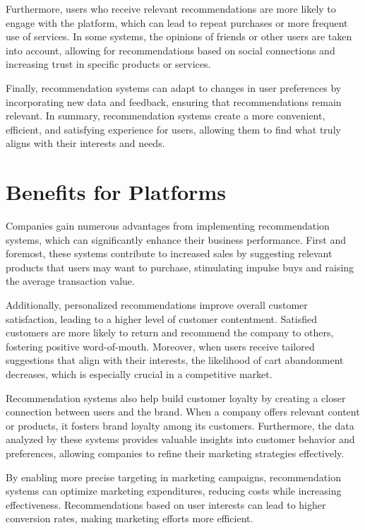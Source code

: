 \documentclass[10pt,twoside,slovak,a4paper]{article}
\begin{document}
Furthermore, users who receive relevant recommendations are more likely to engage with the platform, which can lead to repeat purchases or more frequent use of services. In some systems, the opinions of friends or other users are taken into account, allowing for recommendations based on social connections and increasing trust in specific products or services.

Finally, recommendation systems can adapt to changes in user preferences by incorporating new data and feedback, ensuring that recommendations remain relevant. In summary, recommendation systems create a more convenient, efficient, and satisfying experience for users, allowing them to find what truly aligns with their interests and needs.




\section{Benefits for Platforms} \label{Benefits for Platforms}
Companies gain numerous advantages from implementing recommendation systems\cite{comerce}, which can significantly enhance their business performance. First and foremost, these systems contribute to increased sales by suggesting relevant products that users may want to purchase, stimulating impulse buys and raising the average transaction value.

Additionally, personalized recommendations improve overall customer satisfaction\cite{user}, leading to a higher level of customer contentment. Satisfied customers are more likely to return and recommend the company to others, fostering positive word-of-mouth. Moreover, when users receive tailored suggestions that align with their interests, the likelihood of cart abandonment decreases, which is especially crucial in a competitive market.

Recommendation systems also help build customer loyalty by creating a closer connection between users and the brand\cite{user}. When a company offers relevant content or products, it fosters brand loyalty among its customers. Furthermore, the data analyzed by these systems provides valuable insights into customer behavior and preferences, allowing companies to refine their marketing strategies effectively.

By enabling more precise targeting in marketing campaigns, recommendation systems can optimize marketing expenditures, reducing costs while increasing effectiveness\cite{comerce}. Recommendations based on user interests can lead to higher conversion rates, making marketing efforts more efficient\cite{user}.
\end{document}
